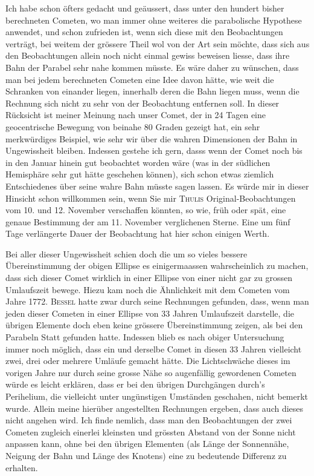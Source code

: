 \par\indent Ich habe schon öfters gedacht und geäussert, dass unter den hundert bisher
berechneten Cometen, wo man immer ohne weiteres die parabolische Hypothese
anwendet, und schon zufrieden ist, wenn sich diese mit den Beobachtungen
verträgt, bei weitem der grössere Theil wol von der Art sein möchte, dass sich
aus den Beobachtungen allein noch nicht einmal gewiss beweisen liesse, dass
ihre Bahn der Parabel sehr nahe kommen müsste. Es wäre daher zu wünschen, dass
man bei jedem berechneten Cometen eine Idee davon hätte, wie weit die
Schranken von einander liegen, innerhalb deren die Bahn liegen muss, wenn die
Rechnung sich nicht zu sehr von der Beobachtung entfernen soll. In dieser
Rücksicht ist meiner Meinung nach unser Comet, der in 24 Tagen eine
geocentrische Bewegung von beinahe 80 Graden gezeigt hat, ein sehr
merkwürdiges Beispiel, wie sehr wir über die wahren Dimensionen der Bahn in
Ungewissheit bleiben. Indessen gestehe ich gern, dasss wenn der Comet noch bis in den Januar hinein gut beobachtet worden wäre (was
in der südlichen Hemisphäre sehr gut hätte geschehen können), sich schon
etwas ziemlich Entschiedenes über seine wahre Bahn müsste sagen lassen. Es
würde mir in dieser Hinsicht schon willkommen sein, wenn Sie mir
\textsc{Thulis} Original-Beobachtungen vom 10. und 12. November verschaffen
könnten, so wie, früh oder spät, eine genaue Bestimmung der am 11. November
verglichenen Sterne. Eine um fünf Tage verlängerte Dauer der Beobachtung hat
hier schon einigen Werth.

\par\indent Bei aller dieser Ungewissheit schien doch die um so vieles bessere
Übereinstimmung der obigen Ellipse es einigermaassen wahrscheinlich zu
machen, dass sich dieser Comet wirklich in einer Ellipse von einer nicht gar
zu grossen Umlaufszeit bewege. Hiezu kam noch die Ähnlichkeit mit dem Cometen
vom Jahre 1772. \textsc{Bessel} hatte zwar durch seine Rechnungen gefunden,
dass, wenn man jeden dieser Cometen in einer Ellipse von 33 Jahren
Umlaufszeit darstelle, die übrigen Elemente doch eben keine grössere
Übereinstimmung zeigen, als bei den Parabeln Statt gefunden hatte. Indessen
blieb es nach obiger Untersuchung immer noch möglich, dass ein und derselbe
Comet in diesen 33 Jahren vielleicht zwei, drei
%
oder mehrere Umläufe gemacht hätte. Die Lichtschwäche dieses im vorigen Jahre nur durch seine grosse
Nähe so augenfällig gewordenen Cometen würde es leicht erklären, dass er bei den übrigen Durchgängen
durch's Perihelium, die vielleicht unter ungünstigen Umständen geschahen, nicht bemerkt wurde.
Allein meine hierüber angestellten Rechnungen ergeben, dass auch dieses nicht angehen wird. Ich finde
nemlich, dass man den Beobachtungen der zwei Cometen zugleich einerlei kleinsten und grössten Abstand
von der Sonne nicht anpassen kann, ohne bei den übrigen Elementen (als Länge der Sonnennähe,
Neigung der Bahn und Länge des Knotens) eine zu bedeutende Differenz zu erhalten.

